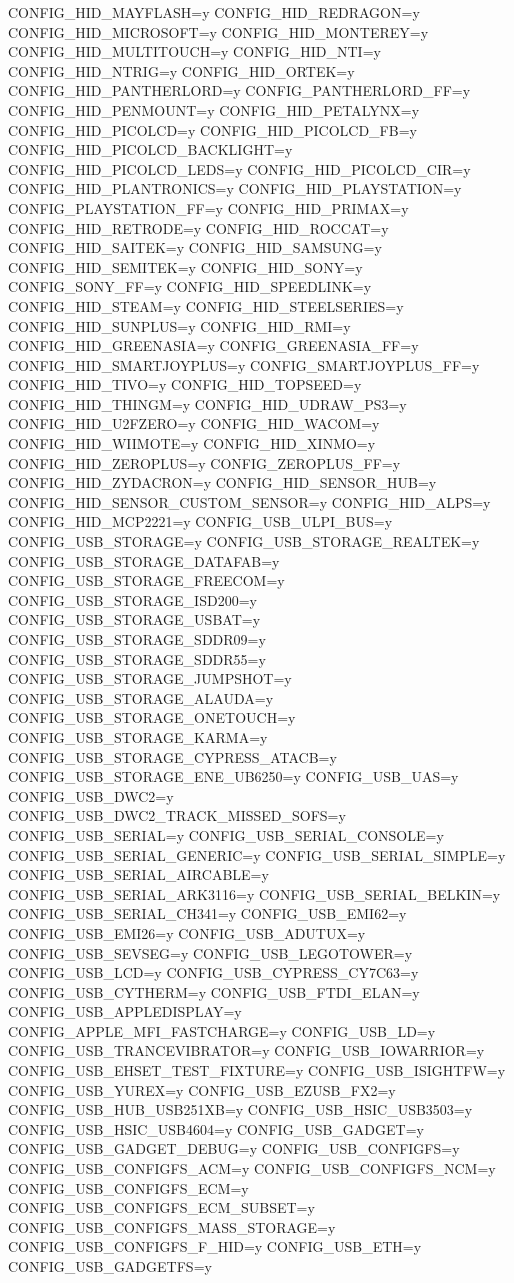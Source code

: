\begin{CodeBlock}[language=BookConfig]
CONFIG_HID_MAYFLASH=y
CONFIG_HID_REDRAGON=y
CONFIG_HID_MICROSOFT=y
CONFIG_HID_MONTEREY=y
CONFIG_HID_MULTITOUCH=y
CONFIG_HID_NTI=y
CONFIG_HID_NTRIG=y
CONFIG_HID_ORTEK=y
CONFIG_HID_PANTHERLORD=y
CONFIG_PANTHERLORD_FF=y
CONFIG_HID_PENMOUNT=y
CONFIG_HID_PETALYNX=y
CONFIG_HID_PICOLCD=y
CONFIG_HID_PICOLCD_FB=y
CONFIG_HID_PICOLCD_BACKLIGHT=y
CONFIG_HID_PICOLCD_LEDS=y
CONFIG_HID_PICOLCD_CIR=y
CONFIG_HID_PLANTRONICS=y
CONFIG_HID_PLAYSTATION=y
CONFIG_PLAYSTATION_FF=y
CONFIG_HID_PRIMAX=y
CONFIG_HID_RETRODE=y
CONFIG_HID_ROCCAT=y
CONFIG_HID_SAITEK=y
CONFIG_HID_SAMSUNG=y
CONFIG_HID_SEMITEK=y
CONFIG_HID_SONY=y
CONFIG_SONY_FF=y
CONFIG_HID_SPEEDLINK=y
CONFIG_HID_STEAM=y
CONFIG_HID_STEELSERIES=y
CONFIG_HID_SUNPLUS=y
CONFIG_HID_RMI=y
CONFIG_HID_GREENASIA=y
CONFIG_GREENASIA_FF=y
CONFIG_HID_SMARTJOYPLUS=y
CONFIG_SMARTJOYPLUS_FF=y
CONFIG_HID_TIVO=y
CONFIG_HID_TOPSEED=y
CONFIG_HID_THINGM=y
CONFIG_HID_UDRAW_PS3=y
CONFIG_HID_U2FZERO=y
CONFIG_HID_WACOM=y
CONFIG_HID_WIIMOTE=y
CONFIG_HID_XINMO=y
CONFIG_HID_ZEROPLUS=y
CONFIG_ZEROPLUS_FF=y
CONFIG_HID_ZYDACRON=y
CONFIG_HID_SENSOR_HUB=y
CONFIG_HID_SENSOR_CUSTOM_SENSOR=y
CONFIG_HID_ALPS=y
CONFIG_HID_MCP2221=y
CONFIG_USB_ULPI_BUS=y
CONFIG_USB_STORAGE=y
CONFIG_USB_STORAGE_REALTEK=y
CONFIG_USB_STORAGE_DATAFAB=y
CONFIG_USB_STORAGE_FREECOM=y
CONFIG_USB_STORAGE_ISD200=y
CONFIG_USB_STORAGE_USBAT=y
CONFIG_USB_STORAGE_SDDR09=y
CONFIG_USB_STORAGE_SDDR55=y
CONFIG_USB_STORAGE_JUMPSHOT=y
CONFIG_USB_STORAGE_ALAUDA=y
CONFIG_USB_STORAGE_ONETOUCH=y
CONFIG_USB_STORAGE_KARMA=y
CONFIG_USB_STORAGE_CYPRESS_ATACB=y
CONFIG_USB_STORAGE_ENE_UB6250=y
CONFIG_USB_UAS=y
CONFIG_USB_DWC2=y
CONFIG_USB_DWC2_TRACK_MISSED_SOFS=y
CONFIG_USB_SERIAL=y
CONFIG_USB_SERIAL_CONSOLE=y
CONFIG_USB_SERIAL_GENERIC=y
CONFIG_USB_SERIAL_SIMPLE=y
CONFIG_USB_SERIAL_AIRCABLE=y
CONFIG_USB_SERIAL_ARK3116=y
CONFIG_USB_SERIAL_BELKIN=y
CONFIG_USB_SERIAL_CH341=y
CONFIG_USB_EMI62=y
CONFIG_USB_EMI26=y
CONFIG_USB_ADUTUX=y
CONFIG_USB_SEVSEG=y
CONFIG_USB_LEGOTOWER=y
CONFIG_USB_LCD=y
CONFIG_USB_CYPRESS_CY7C63=y
CONFIG_USB_CYTHERM=y
CONFIG_USB_FTDI_ELAN=y
CONFIG_USB_APPLEDISPLAY=y
CONFIG_APPLE_MFI_FASTCHARGE=y
CONFIG_USB_LD=y
CONFIG_USB_TRANCEVIBRATOR=y
CONFIG_USB_IOWARRIOR=y
CONFIG_USB_EHSET_TEST_FIXTURE=y
CONFIG_USB_ISIGHTFW=y
CONFIG_USB_YUREX=y
CONFIG_USB_EZUSB_FX2=y
CONFIG_USB_HUB_USB251XB=y
CONFIG_USB_HSIC_USB3503=y
CONFIG_USB_HSIC_USB4604=y
CONFIG_USB_GADGET=y
CONFIG_USB_GADGET_DEBUG=y
CONFIG_USB_CONFIGFS=y
CONFIG_USB_CONFIGFS_ACM=y
CONFIG_USB_CONFIGFS_NCM=y
CONFIG_USB_CONFIGFS_ECM=y
CONFIG_USB_CONFIGFS_ECM_SUBSET=y
CONFIG_USB_CONFIGFS_MASS_STORAGE=y
CONFIG_USB_CONFIGFS_F_HID=y
CONFIG_USB_ETH=y
CONFIG_USB_GADGETFS=y

\end{CodeBlock}
